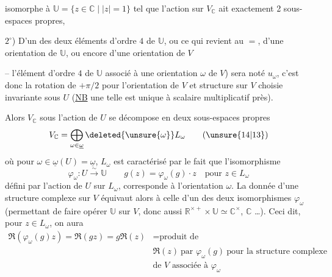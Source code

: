  isomorphe à $\mathbb U=\{z\in\mathbb C\mid |z|=1\}$ tel que l'action sur $V_{\mathbb C}$ ait exactement 2 sous-espaces propres,

$2^\circ$) D'un des deux éléments d'ordre $4$ de $\mathbb U$, ou ce qui revient au $=$, d'une orientation de $\mathbb U$, ou encore  d'une orientation de $V$

-- l'élément d'ordre $4$ de $\mathbb U$ associé à une orientation $\omega$ de  $V$) sera noté $u_\omega$, c'est donc la rotation de $+\pi/2$ pour l'orientation \inserted{$\omega$} de $V$ et  structure  sur $V$ choisie invariante sous $U$ (\uline{NB}  une telle  est unique à scalaire multiplicatif près).

Alors $V_{\mathbb C}$ sous l'action de $U$ se décompose en deux sous-espaces propres
\[
 V_{\mathbb C}=\bigoplus_{\omega\in\underline\omega}\deleted{\unsure{\omega}}L_\omega \tag*{(\unsure{14|13})}
\]
où pour $\omega\in\underline\omega(U)=\underline\omega$, $L_\omega$ est caractérisé par le fait que l'isomorphisme
\[
 \varphi_\omega\colon U\xrightarrow{\sim}\mathbb U\qquad g(z)=\varphi_\omega(g)\cdot z\quad\text{pour }z\in L_\omega \tag*{(15)}
\]
défini par l'action de $U$ sur $L_\omega$, corresponde à l'orientation $\omega$. La donnée d'une structure complexe sur $V$  équivaut alors à celle d'un des deux isomorphismes $\varphi_\omega$ (permettant de faire opérer $\mathbb U$ sur $V$, donc aussi $\mathbb R^{\times+}\times\mathbb U\simeq\mathbb C^\times$,  $\mathbb C$ \ldots). Ceci dit, pour  $z\in L_\omega$, on aura
\[
 \begin{aligned}
 \Re (\varphi_\omega(g)z)=\Re (gz)=g\Re (z)&=\text{produit de}\\
 &\Re (z)\ \text{par }\varphi_\omega(g)\ \text{pour la structure complexe}\\[-2pt]
 &\text{de }V\text{ associée à }\varphi_\omega
 \end{aligned}
\]
